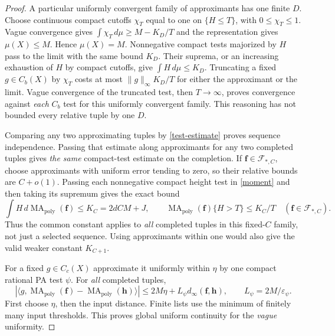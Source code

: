 \documentclass[11pt]{article}
\newcommand{\MA}{\operatorname{MA}_{\mathrm{poly}}}
\begin{document}
\begin{proof}
A particular uniformly convergent family of approximants has one finite
$D$. Choose continuous compact cutoffs $\chi_T$ equal to one on
$\{H\leq T\}$, with $0\leq\chi_T\leq1$.
Vague convergence gives $\int\chi_T\,d\mu\geq M-K_D/T$ and the
representation gives $\mu(X)\leq M$. Hence $\mu(X)=M$.
Nonnegative compact tests majorized by $H$ pass to the limit with the
same bound $K_D$. Their suprema, or an increasing exhaustion of $H$ by
compact cutoffs, give $\int H\,d\mu\leq K_D$.
Truncating a fixed $g\in C_b(X)$ by $\chi_T$ costs at most
$\|g\|_\infty K_D/T$ for either the approximant or the limit.
Vague convergence of the truncated test, then $T\to\infty$, proves
convergence against \emph{each} $C_b$ test for this uniformly convergent
family. This reasoning has not bounded every relative tuple by one $D$.

Comparing any two approximating tuples by \eqref{test-estimate} proves
sequence independence. Passing that estimate along approximants for
any two completed tuples gives \emph{the same} compact-test estimate
on the completion. If $\mathbf f\in\mathcal F_{*,C}$, choose approximants
with uniform error tending to zero, so their relative bounds are
$C+o(1)$. Passing each nonnegative compact height test in
\eqref{moment} and then taking its supremum gives the exact bound
\begin{equation}\label{completed-moment}
 \int H\,d\MA(\mathbf f)\leq K_C=2dCM+J,
 \qquad \MA(\mathbf f)\{H>T\}\leq K_C/T
       \quad(\mathbf f\in\mathcal F_{*,C}).
\end{equation}
Thus the common constant applies to \emph{all} completed tuples in
this fixed-$C$ family, not just a selected sequence. Using approximants
within one would also give the valid weaker constant $K_{C+1}$.

For a fixed $g\in C_c(X)$ approximate it uniformly within $\eta$ by
one compact rational PA test $\psi$. For \emph{all} completed tuples,
\[
 |\langle g,\MA(\mathbf f)-\MA(\mathbf h)\rangle|
 \leq2M\eta+L_\psi d_\infty(\mathbf f,\mathbf h),\qquad
 L_\psi=2M/\varepsilon_\psi.
\]
First choose $\eta$, then the input distance. Finite lists use the
minimum of finitely many input thresholds. This proves global uniform
continuity for the \emph{vague} uniformity.


\end{proof}
\end{document}
